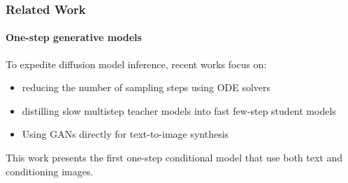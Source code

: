 \begin{frame}
    \frametitle{Related Work}
    \framesubtitle{One-step generative models}
    To expedite diffusion model inference, recent works focus on:
    \begin{itemize}
        \item reducing the number of sampling steps using ODE solvers \cite{karras2022elucidating, lu2022dpmsolver}
        \item distilling slow multistep teacher models into fast few-step student models \cite{meng2022sdedit, salimans2022progressive}
        \item Using GANs directly for text-to-image synthesis \cite{kang2023scaling, sauer2023stylegant}
    \end{itemize}
    
    This work presents the first one-step conditional model that use both text and conditioning images.
\end{frame}
